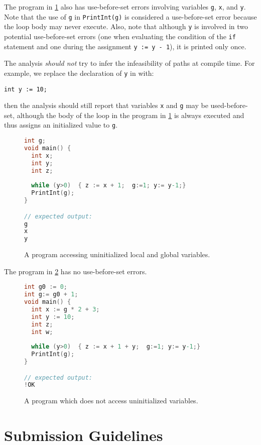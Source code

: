 \documentclass{article}
\begin{document}
The program in \cref{fig:example-loop} also has use-before-set errors involving variables \texttt{g}, \texttt{x}, and \texttt{y}.
Note that the use of \texttt{g} in \texttt{PrintInt(g)} is considered a use-before-set error because the loop body may never execute.
Also, note that although \texttt{y} is involved in two potential use-before-set errors (one when evaluating the condition of the \texttt{if} statement and one during the assignment \texttt{y := y - 1}), it is printed only once.

The analysis \emph{should not} try to infer the infeasibility of paths at compile time.
For example, we replace the declaration of \texttt{y} in  with:
\begin{lstlisting}
int y := 10;
\end{lstlisting}
then the analysis should still report that variables \texttt{x} and \texttt{g} may be used-before-set,
although the body of the loop in the program in \cref{fig:example-loop} is always executed and thus assigns an initialized value to \texttt{g}.

\begin{figure}
\centering
\begin{lstlisting}[language=C]
int g;
void main() {
  int x;
  int y;
  int z;
  
  while (y>0)  { z := x + 1;  g:=1; y:= y-1;}
  PrintInt(g);
}

// expected output:
g
x
y
\end{lstlisting}
\caption{A program accessing uninitialized local and global variables.}
\label{fig:example-loop}
\end{figure} 

The program in \cref{fig:example-ok}  has no use-before-set errors. 

\begin{figure}
\centering
\begin{lstlisting}[language=C]
int g0 := 0;
int g:= g0 + 1;
void main() {
  int x := g * 2 + 3;
  int y := 10;
  int z;
  int w;
  
  while (y>0)  { z := x + 1 + y;  g:=1; y:= y-1;}
  PrintInt(g);
}

// expected output:
!OK
\end{lstlisting}
\caption{A program which does not access uninitialized variables.}
\label{fig:example-ok}
\end{figure} 

\section{Submission Guidelines}
 
\end{document}
